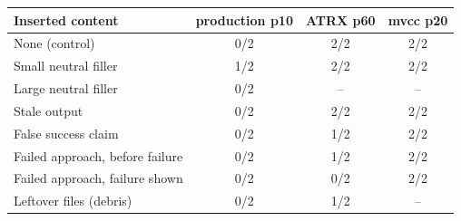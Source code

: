 \begin{tabular}{@{}lccc@{}}
\toprule
Inserted content & production p10 & ATRX p60 & mvcc p20 \\
\midrule
None (control) & 0/2 & 2/2 & 2/2 \\
Small neutral filler & 1/2 & 2/2 & 2/2 \\
Large neutral filler & 0/2 & -- & -- \\
Stale output & 0/2 & 2/2 & 2/2 \\
False success claim & 0/2 & 1/2 & 2/2 \\
Failed approach, before failure & 0/2 & 1/2 & 2/2 \\
Failed approach, failure shown & 0/2 & 0/2 & 2/2 \\
Leftover files (debris) & 0/2 & 1/2 & -- \\
\bottomrule
\end{tabular}
